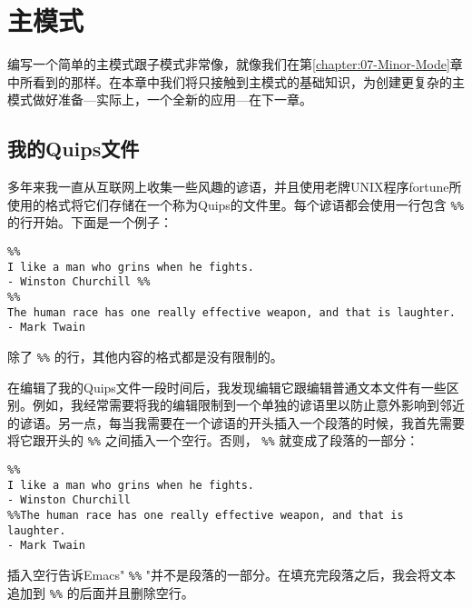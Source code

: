 \chapter{主模式}
\label{chapter:09-A-Major-Mode}


编写一个简单的主模式跟子模式非常像，就像我们在第\ref{chapter:07-Minor-Mode}章中所看到的那样。在本章中我们将只接触到主模式的基础知识，为创建更复杂的主模式做好准备---实际上，一个全新的应用---在下一章。

\section{我的Quips文件}
\label{section:09-My-Quips-File}

多年来我一直从互联网上收集一些风趣的谚语，并且使用老牌UNIX程序fortune所使用的格式将它们存储在一个称为Quips的文件里。每个谚语都会使用一行包含 \verb|%%| 的行开始。下面是一个例子：

\begin{verbatim}
%%
I like a man who grins when he fights.
- Winston Churchill %%
%%
The human race has one really effective weapon, and that is laughter.
- Mark Twain
\end{verbatim}

除了 \verb|%%| 的行，其他内容的格式都是没有限制的。

在编辑了我的Quips文件一段时间后，我发现编辑它跟编辑普通文本文件有一些区别。例如，我经常需要将我的编辑限制到一个单独的谚语里以防止意外影响到邻近的谚语。另一点，每当我需要在一个谚语的开头插入一个段落的时候，我首先需要将它跟开头的 \verb|%%| 之间插入一个空行。否则， \verb|%%| 就变成了段落的一部分：

\begin{verbatim}
%%
I like a man who grins when he fights.
- Winston Churchill
%%The human race has one really effective weapon, and that is laughter.
- Mark Twain
\end{verbatim}

插入空行告诉Emacs" \verb|%%| "并不是段落的一部分。在填充完段落之后，我会将文本追加到 \verb|%%| 的后面并且删除空行。

